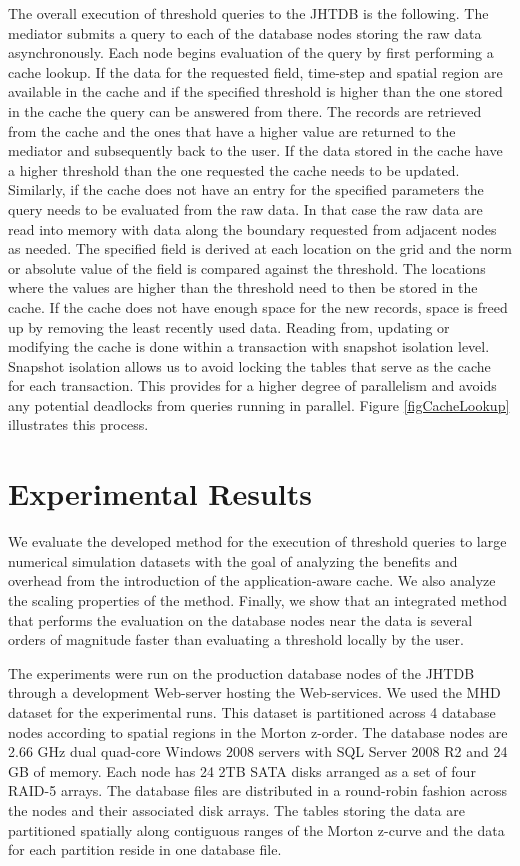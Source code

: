 \documentclass{sig-alternate}
\begin{document}
The overall execution of threshold queries to the JHTDB is the following. The mediator submits a query to each of the database nodes storing the raw data
asynchronously. Each node begins evaluation of the query by first performing a cache lookup. If the data for the requested field, time-step and spatial region
are available in the cache and if the specified threshold is higher than the one stored in the cache the query can be answered from there. The records are
retrieved from the cache and the ones that have a higher value are returned to the mediator and subsequently back to the user. If the data stored in the
cache have a higher threshold than the one requested the cache needs to be updated. Similarly, if the cache does not have an entry for the specified 
parameters the query needs to be evaluated from the raw data. In that case the raw data are read into memory with data along the boundary requested from
adjacent nodes as needed. The specified field is derived at each location on the grid and the norm or absolute value of the field is compared against
the threshold. The locations where the values are higher than the threshold need to then be stored in the cache. If the cache does not have enough space
for the new records, space is freed up by removing the least recently used data.  Reading from, updating or modifying the cache is done within a
transaction with snapshot isolation level. Snapshot isolation allows us to avoid locking the tables that serve as the cache for each transaction. This
provides for a higher degree of parallelism and avoids any potential deadlocks from queries running in parallel. Figure \ref{figCacheLookup} illustrates this process.

\section{Experimental Results}
We evaluate the developed method for the execution of threshold queries to large numerical simulation datasets with the goal of analyzing the 
benefits and overhead from the introduction of the application-aware cache. We also analyze the scaling properties of the method. Finally, we show
that an integrated method that performs the evaluation on the database nodes near the data is several orders of magnitude faster than evaluating
a threshold locally by the user.

The experiments were run on the production database nodes of the JHTDB through a development Web-server hosting the Web-services. We used
the MHD dataset for the experimental runs. This dataset is partitioned across 4 database nodes according to spatial regions in the Morton z-order. 
The database nodes are 2.66 GHz dual quad-core Windows 2008 servers with SQL Server 2008 R2 and 24 GB of memory. Each node has 24 2TB 
SATA disks arranged as a set of four RAID-5 arrays. The database files are distributed in a round-robin fashion across the nodes and their associated disk
arrays. The tables storing the data are partitioned spatially along contiguous ranges of the Morton z-curve and the data for each partition reside in one
database file. 
\end{document}
